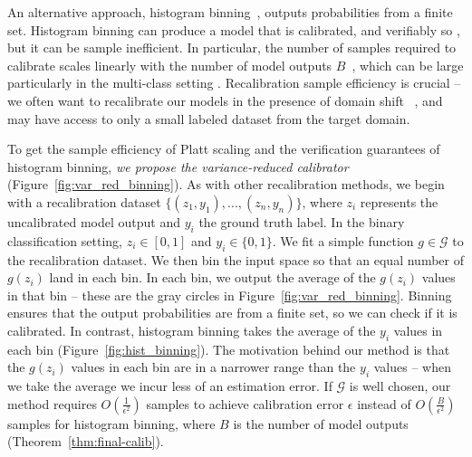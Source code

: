 An alternative approach, histogram binning~\cite{zadrozny2001calibrated}, outputs probabilities from a finite set.
Histogram binning can produce a model that is calibrated, and verifiably so , but it can be sample inefficient.
In particular, the number of samples required to calibrate scales linearly with the number of model outputs $B$~\cite{naeini2014binary}, which can be large particularly in the multi-class setting .
Recalibration sample efficiency is crucial -- we often want to recalibrate our models in the presence of domain shift~\cite{hendrycks2019anomaly} , and may have access to only a small labeled dataset from the target domain.

To get the sample efficiency of Platt scaling and the verification guarantees of histogram binning, \emph{we propose the variance-reduced calibrator} (Figure~\ref{fig:var_red_binning}).
As with other recalibration methods, we begin with a recalibration dataset $\{(z_1, y_1), ..., (z_n, y_n)\}$, where $z_i$ represents the uncalibrated model output and $y_i$ the ground truth label.
In the binary classification setting, $z_i \in [0, 1]$ and $y_i \in \{0, 1\}$.
We fit a simple function $g \in \mathcal{G}$ to the recalibration dataset.
We then bin the input space so that an equal number of $g(z_i)$ land in each bin.
In each bin, we output the average of the $g(z_i)$ values in that bin -- these are the gray circles in Figure~\ref{fig:var_red_binning}.
Binning ensures that the output probabilities are from a finite set, so we can check if it is calibrated.
In contrast, histogram binning takes the average of the $y_i$ values in each bin (Figure~\ref{fig:hist_binning}).
The motivation behind our method is that the $g(z_i)$ values in each bin are in a narrower range than the $y_i$ values -- when we take the average we incur less of an estimation error.
If $\mathcal{G}$ is well chosen, our method requires $O(\frac{1}{\epsilon^2})$ samples to achieve calibration error $\epsilon$ instead of $O(\frac{B}{\epsilon^2})$ samples for histogram binning, where $B$ is the number of model outputs (Theorem~\ref{thm:final-calib}).

